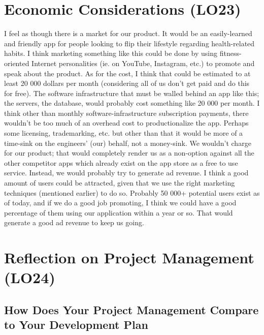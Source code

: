 \documentclass{article}
\begin{document}
\section{Economic Considerations (LO23)}
I feel as though there is a market for our product. It would be an easily-learned and friendly app for people looking to flip their lifestyle regarding health-related habits. I think marketing something like this could be done by using fitness-oriented Internet personalities (ie. on YouTube, Instagram, etc.) to promote and speak about the product. As for the cost, I think that could be estimated to at least 20 000 dollars per month (considering all of us don't get paid and do this for free). The software infrastructure that must be walled behind an app like this; the servers, the database, would probably cost something like 20 000 per month. I think other than monthly software-infrastructure subscription payments, there wouldn't be too much of an overhead cost to productionalize the app. Perhaps some licensing, trademarking, etc. but other than that it would be more of a time-sink on the engineers' (our) behalf, not a money-sink.  We wouldn't charge for our product; that would completely render us as a non-option against all the other competitor apps which already exist on the app store as a free to use service. Instead, we would probably try to generate ad revenue. I think a good amount of users could be attracted, given that we use the right marketing techniques (mentioned earlier) to do so. Probably 50 000+ potential users exist as of today, and if we do a good job promoting, I think we could have a good percentage of them using our application within a year or so. That would generate a good ad revenue to keep us going.\\

\section{Reflection on Project Management (LO24)}


\subsection{How Does Your Project Management Compare to Your Development Plan}

\end{document}
